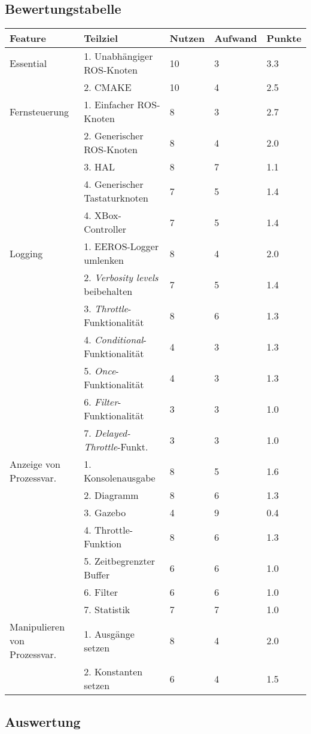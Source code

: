 \subsection{Bewertungstabelle}
\begin{tabular}
  { l								| l			 								l			 l			 l }
  \textbf{Feature}					& \textbf{Teilziel}	& \textbf{Nutzen}	& \textbf{Aufwand}	& \textbf{Punkte}	\\ \hline
  
  Essential							& 1. Unabhängiger ROS-Knoten				& 10		& 3			& 3.3		\\
  									& 2. CMAKE									& 10		& 4			& 2.5		\\ \hline
  Fernsteuerung						& 1. Einfacher ROS-Knoten					& 8			& 3			& 2.7		\\
  									& 2. Generischer ROS-Knoten					& 8			& 4			& 2.0		\\
  									& 3. HAL									& 8			& 7			& 1.1		\\
  									& 4. Generischer Tastaturknoten				& 7			& 5			& 1.4		\\ 
  									& 4. XBox-Controller						& 7			& 5			& 1.4		\\ \hline
  Logging 							& 1. EEROS-Logger umlenken					& 8			& 4			& 2.0		\\
  									& 2. \textit{Verbosity levels} beibehalten	& 7			& 5			& 1.4		\\
  									& 3. \textit{Throttle}-Funktionalität		& 8			& 6			& 1.3		\\
  									& 4. \textit{Conditional}-Funktionalität 	& 4			& 3			& 1.3		\\
  									& 5. \textit{Once}-Funktionalität			& 4			& 3			& 1.3		\\
  									& 6. \textit{Filter}-Funktionalität			& 3			& 3			& 1.0		\\
  									& 7. \textit{Delayed-Throttle}-Funkt.		& 3			& 3			& 1.0		\\ \hline
  Anzeige von Prozessvar.			& 1. Konsolenausgabe 						& 8			& 5			& 1.6		\\
  									& 2. Diagramm								& 8			& 6			& 1.3		\\
  									& 3. Gazebo									& 4			& 9			& 0.4		\\
  									& 4. Throttle-Funktion						& 8			& 6			& 1.3		\\
  									& 5. Zeitbegrenzter Buffer					& 6			& 6			& 1.0		\\
  									& 6. Filter									& 6			& 6			& 1.0		\\
  									& 7. Statistik								& 7			& 7			& 1.0		\\ \hline
  Manipulieren von Prozessvar.		& 1. Ausgänge setzen						& 8			& 4			& 2.0		\\
  									& 2. Konstanten setzen						& 6			& 4			& 1.5		\\ \hline
\end{tabular}

\subsection{Auswertung}
